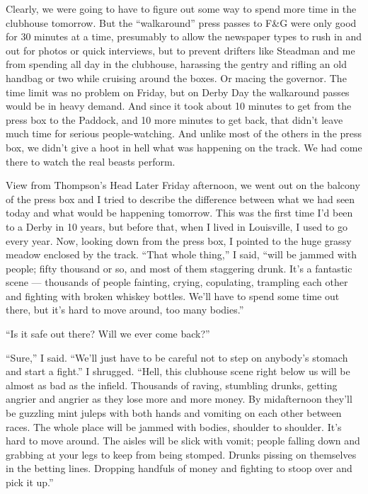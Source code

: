 \documentclass[10pt,a4paper]{article}
\begin{document}
Clearly, we were going to have to figure out some way to spend more time in the clubhouse tomorrow. But the “walkaround” press passes to F\&G were only good for 30 minutes at a time, presumably to allow the newspaper types to rush in and out for photos or quick interviews, but to prevent drifters like Steadman and me from spending all day in the clubhouse, harassing the gentry and rifling an old handbag or two while cruising around the boxes. Or macing the governor. The time limit was no problem on Friday, but on Derby Day the walkaround passes would be in heavy demand. And since it took about 10 minutes to get from the press box to the Paddock, and 10 more minutes to get back, that didn’t leave much time for serious people-watching. And unlike most of the others in the press box, we didn’t give a hoot in hell what was happening on the track. We had come there to watch the real beasts perform.

View from Thompson’s Head
Later Friday afternoon, we went out on the balcony of the press box and I tried to describe the difference between what we had seen today and what would be happening tomorrow. This was the first time I’d been to a Derby in 10 years, but before that, when I lived in Louisville, I used to go every year. Now, looking down from the press box, I pointed to the huge grassy meadow enclosed by the track. “That whole thing,” I said, “will be jammed with people; fifty thousand or so, and most of them staggering drunk. It’s a fantastic scene — thousands of people fainting, crying, copulating, trampling each other and fighting with broken whiskey bottles. We’ll have to spend some time out there, but it’s hard to move around, too many bodies.”

“Is it safe out there? Will we ever come back?”

“Sure,” I said. “We’ll just have to be careful not to step on anybody’s stomach and start a fight.” I shrugged. “Hell, this clubhouse scene right below us will be almost as bad as the infield. Thousands of raving, stumbling drunks, getting angrier and angrier as they lose more and more money. By midafternoon they’ll be guzzling mint juleps with both hands and vomiting on each other between races. The whole place will be jammed with bodies, shoulder to shoulder. It’s hard to move around. The aisles will be slick with vomit; people falling down and grabbing at your legs to keep from being stomped. Drunks pissing on themselves in the betting lines. Dropping handfuls of money and fighting to stoop over and pick it up.”
\end{document}
